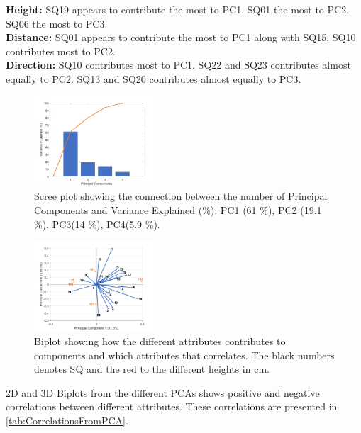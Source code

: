 \noindent
\textbf{Height:} SQ19 appears to contribute the most to PC1. SQ01 the most to PC2. SQ06 the most to PC3. \\
\textbf{Distance:} SQ01 appears to contribute the most to PC1 along with SQ15. SQ10 contributes most to PC2.\\
\textbf{Direction:} SQ10 contributes most to PC1. SQ22 and SQ23 contributes almost equally to PC2. SQ13 and SQ20 contributes almost equally to PC3.\\
%
\begin{figure}[H]
	\centering
	\includegraphics[width = 0.40\textwidth]{Figure/Scree.png}
	\caption{Scree plot showing the connection between the number of Principal Components and Variance Explained (\%): PC1 (61 \%), PC2 (19.1 \%), PC3(14 \%), PC4(5.9 \%).}
	\label{fig:Scree}
\end{figure}
\noindent
%
\begin{figure}[H]
	\centering
	\includegraphics[width = 0.40\textwidth]{Figure/RHeight-Biplot.png}
	\caption{Biplot showing how the different attributes contributes to components and which attributes that correlates. The black numbers denotes SQ and the red to the different heights in cm.}
	\label{fig:biplot}
\end{figure}
\noindent
%
2D and 3D Biplots from the different PCAs shows positive and negative correlations between different attributes. These correlations are presented in \autoref{tab:CorrelationsFromPCA}.
%
